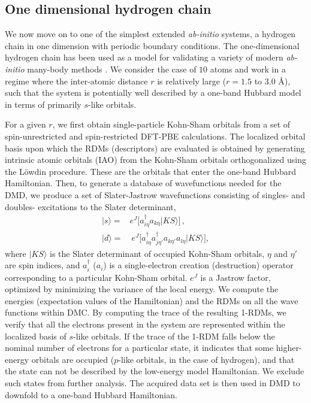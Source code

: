 \subsection{One dimensional hydrogen chain}
\label{subsection:1dhydrogen}
We now move on to one of the simplest extended \emph{ab-initio} systems, a hydrogen chain in one dimension with periodic boundary conditions. The one-dimensional hydrogen chain has been used as a model for validating a variety of modern \textit{ab-initio} many-body methods \cite{H10_Simons}. 
We consider the case of $10$ atoms and work in a regime where the inter-atomic distance $r$ is 
relatively large ($r=1.5$ to $3.0$ \AA), such that the system is potentially well described by a one-band Hubbard model 
in terms of primarily $s$-like orbitals. 

For a given $r$, we first obtain single-particle Kohn-Sham orbitals from a set of spin-unrestricted and 
spin-restricted DFT-PBE calculations. The localized orbital basis upon which the RDMs (descriptors) 
are evaluated is obtained by generating intrinsic atomic orbitals (IAO) from the Kohn-Sham orbitals 
orthogonalized using the L\"owdin procedure. These are the orbitals that enter the one-band Hubbard Hamiltonian. 
Then, to generate a database of wavefunctions needed for the DMD, we produce a set of Slater-Jastrow 
wavefunctions consisting of singles- and doubles- excitations to the Slater determinant, 
\begin{subequations}
\begin{eqnarray}
| s \rangle = & e^J \Big[a^\dagger_{i \eta} a_{k \eta}   | KS \rangle \Big] \,,\\
| d \rangle = & \: e^J \Big[a^\dagger_{i \eta} a^\dagger_{j \eta'} a_{k \eta'} a_{l \eta}   | KS \rangle\Big] ,
\end{eqnarray}
\end{subequations}
where $|KS\rangle$ is the Slater determinant of occupied Kohn-Sham orbitals, $\eta$ and $\eta'$ are spin indices, 
and $a_{i}^\dagger$ ($a_{i}$) is a single-electron creation (destruction) operator corresponding to a particular Kohn-Sham orbital. $e^J$ is a Jastrow factor, optimized by minimizing the variance of the local energy. 
We compute the energies (expectation values of the Hamiltonian) and the RDMs on all the wave functions within DMC. 
By computing the trace of the resulting 1-RDMs, we verify that all the electrons present in the system are represented within the localized basis of $s$-like orbitals. If the trace of the 1-RDM falls below the nominal number of electrons for a particular state, it 
indicates that some higher-energy orbitals are occupied ($p$-like orbitals, in the case of hydrogen), and that the state can not be described by the low-energy model Hamiltonian. We exclude such states from further analysis. The acquired data set is then used in DMD to 
downfold to a one-band Hubbard Hamiltonian.%

